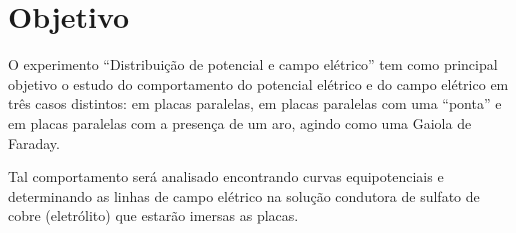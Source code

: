 \section{Objetivo}
    O experimento “Distribuição de potencial e campo elétrico” 
    tem como principal objetivo o estudo do comportamento do 
    potencial elétrico e do campo elétrico em três casos distintos: 
    em placas paralelas, em placas paralelas com uma “ponta” e em 
    placas paralelas com a presença de um aro, agindo como uma Gaiola de Faraday. 
    
    Tal comportamento será analisado encontrando curvas equipotenciais e 
    determinando as linhas de campo elétrico na solução condutora de 
    sulfato de cobre (eletrólito) que estarão imersas as placas.
    
